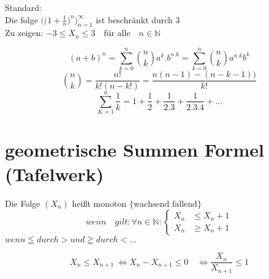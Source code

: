 \begin{example}{Standard:}\\

{Die folge}
$ \bigg(\big(1 + \frac{1}{n} \big)^n \bigg)^\infty_{n=1}$
{ist beschränkt durch 3}\\

Zu zeigen: \quad $ -3 \leq X_n \leq 3 \quad \text{für alle} \quad n \in \mathbb{N} $


\[ { (a+b)^n = \sum_{k=0}^{n} \binom{n}{k} a^k . b^{n .k} = \sum_{k=0}^{n} \binom{n}{k} a^{n.k} b^k }  \]
\[  \binom{n}{k} = \frac{n!}{k!(n-k!)} =  \frac{n(n-1) -(n-k-1))}{k!} \]
\[  \sum_{K=1}^{n} \frac{1}{k} = 1+ \frac{1}{2} + \frac{1}{2.3} + \frac{1}{2.3.4} + \dots \]
\end{example}


\section{geometrische Summen Formel (Tafelwerk)}
\begin{definition}

    Die Folge $(X_n)$ heißt monoton $\Big\{ \text{wachsend fallend} \Big\}$
    \[ wenn \quad gilt: \forall n \in \mathbb{N}:
    \left\{
    \begin{array}{ll}
        X_n  & \leq X_n +1 \\
        X_n  & \geq X_n+1
    \end{array}
    \right. \]
    $ wenn \leqq durch > und \geqq durch < \dots  $
\end{definition}
\begin{remark}
    \[ X_n \leq X_{n+1} \ \Leftrightarrow  X_n - X_{n+1} \leq 0 \quad \Leftrightarrow  \frac{X_n}{X_{n+1}} \leq 1 \]
\end{remark}

